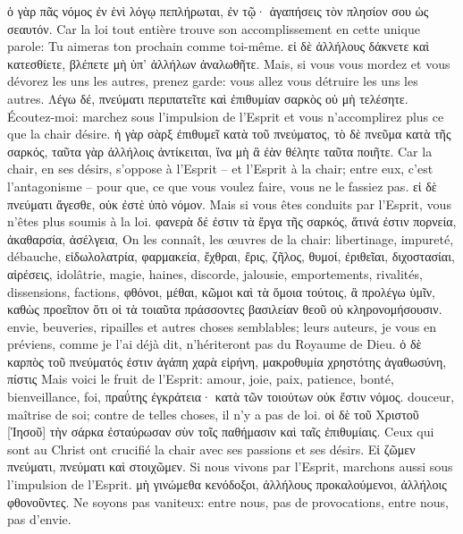 \documentclass[14pt,a4paper,twoside]{extarticle}
\begin{document}
\begin{paracol}[1]
  \verset
  {ὁ γὰρ πᾶς νόμος ἐν ἑνὶ λόγῳ πεπλήρωται, ἐν τῷ· ἀγαπήσεις τὸν πλησίον σου ὡς σεαυτόν.}
  {Car la loi tout entière trouve son accomplissement en cette unique parole: Tu aimeras ton prochain comme toi-même.}
  \verset
  {εἰ δὲ ἀλλήλους δάκνετε καὶ κατεσθίετε, βλέπετε μὴ ὑπ’ ἀλλήλων ἀναλωθῆτε.}
  {Mais, si vous vous mordez et vous dévorez les uns les autres, prenez garde: vous allez vous détruire les uns les autres.}
  \verset
  {Λέγω δέ, πνεύματι περιπατεῖτε καὶ ἐπιθυμίαν σαρκὸς οὐ μὴ τελέσητε.}
  {Écoutez-moi: marchez sous l’impulsion de l’Esprit et vous n’accomplirez plus ce que la chair désire.}
  \verset
  {ἡ γὰρ σὰρξ ἐπιθυμεῖ κατὰ τοῦ πνεύματος, τὸ δὲ πνεῦμα κατὰ τῆς σαρκός, ταῦτα γὰρ ἀλλήλοις ἀντίκειται, ἵνα μὴ ἃ ἐὰν θέλητε ταῦτα ποιῆτε.}
  {Car la chair, en ses désirs, s’oppose à l’Esprit – et l’Esprit à la chair; entre eux, c’est l’antagonisme – pour que, ce que vous voulez faire, vous ne le fassiez pas.}
  \verset
  {εἰ δὲ πνεύματι ἄγεσθε, οὐκ ἐστὲ ὑπὸ νόμον.}
  {Mais si vous êtes conduits par l’Esprit, vous n’êtes plus soumis à la loi.}
  \verset
  {φανερὰ δέ ἐστιν τὰ ἔργα τῆς σαρκός, ἅτινά ἐστιν πορνεία, ἀκαθαρσία, ἀσέλγεια,}
  {On les connaît, les œuvres de la chair: libertinage, impureté, débauche,}
  \verset
  {εἰδωλολατρία, φαρμακεία, ἔχθραι, ἔρις, ζῆλος, θυμοί, ἐριθεῖαι, διχοστασίαι, αἱρέσεις,}
  {idolâtrie, magie, haines, discorde, jalousie, emportements, rivalités, dissensions, factions,}
  \verset
  {φθόνοι, μέθαι, κῶμοι καὶ τὰ ὅμοια τούτοις, ἃ προλέγω ὑμῖν, καθὼς προεῖπον ὅτι οἱ τὰ τοιαῦτα πράσσοντες βασιλείαν θεοῦ οὐ κληρονομήσουσιν.}
  {envie, beuveries, ripailles et autres choses semblables; leurs auteurs, je vous en préviens, comme je l’ai déjà dit, n’hériteront pas du Royaume de Dieu.}
  \verset
  {ὁ δὲ καρπὸς τοῦ πνεύματός ἐστιν ἀγάπη χαρὰ εἰρήνη, μακροθυμία χρηστότης ἀγαθωσύνη, πίστις}
  {Mais voici le fruit de l’Esprit: amour, joie, paix, patience, bonté, bienveillance, foi,}
  \verset
  {πραΰτης ἐγκράτεια· κατὰ τῶν τοιούτων οὐκ ἔστιν νόμος.}
  {douceur, maîtrise de soi; contre de telles choses, il n’y a pas de loi.}
  \verset
  {οἱ δὲ τοῦ Χριστοῦ [Ἰησοῦ] τὴν σάρκα ἐσταύρωσαν σὺν τοῖς παθήμασιν καὶ ταῖς ἐπιθυμίαις.}
  {Ceux qui sont au Christ ont crucifié la chair avec ses passions et ses désirs.}
  \verset
  {Εἰ ζῶμεν πνεύματι, πνεύματι καὶ στοιχῶμεν.}
  {Si nous vivons par l’Esprit, marchons aussi sous l’impulsion de l’Esprit.}
  \verset
  {μὴ γινώμεθα κενόδοξοι, ἀλλήλους προκαλούμενοι, ἀλλήλοις φθονοῦντες.}
  {Ne soyons pas vaniteux: entre nous, pas de provocations, entre nous, pas d’envie.}


\end{paracol}
\end{document}
